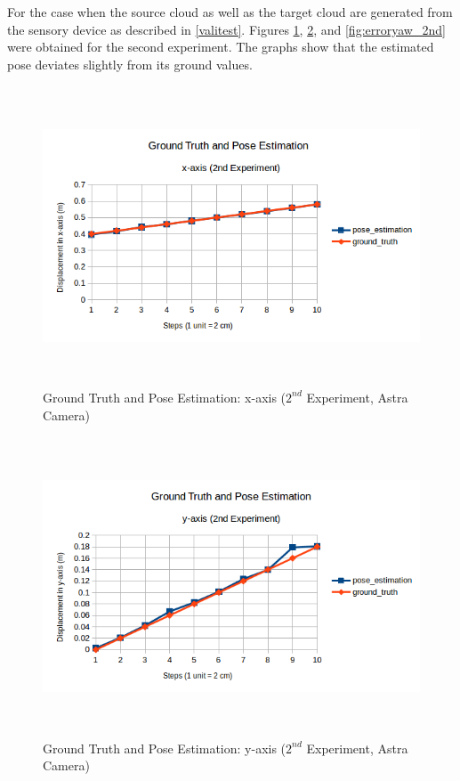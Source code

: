 For the case when the source cloud as well as the target cloud are generated from the sensory device as described in \ref{valitest}. Figures \ref{fig:errorx_2nd}, \ref{fig:errory_2nd}, and \ref{fig:erroryaw_2nd} were obtained for the second experiment. The graphs show that the estimated pose deviates slightly from its ground values.
\begin{figure}[!h]
\begin{center}
\includegraphics[width=5in, height=3.5in]{figures05/2_x_validation.png}
\caption{Ground Truth and Pose Estimation: x-axis ($2^{nd}$ Experiment, Astra Camera)}
\label{fig:errorx_2nd}
\end{center}
\end{figure}
\begin{figure}[!h]
\begin{center}
\includegraphics[width=5in, height=3.5in]{figures05/2_y_validation.png}
\caption{Ground Truth and Pose Estimation: y-axis ($2^{nd}$ Experiment, Astra Camera)}
\label{fig:errory_2nd}
\end{center}
\end{figure}
